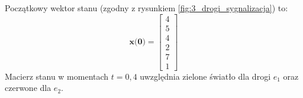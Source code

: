 \documentclass[12pt]{book}
\theoremstyle{plain}
\begin{document}
\def \xzero{
	\begin{bmatrix}
		4 \\ 5 \\ 4 \\ 2 \\ 7 \\ 1
	\end{bmatrix}
}
Początkowy wektor stanu (zgodny z rysunkiem \ref{fig:3_drogi_sygnalizacja}) to:
\[\textbf{x(0)}= \xzero \]
Macierz stanu w momentach $t=0,4$ uwzględnia zielone światło dla drogi $e_1$ oraz czerwone dla $e_2$.
\def \aeI{
\begin{bmatrix}
	0 & 0                     & 0 & 0 & 0 & 0 \\
	1 & \colorbox{red!30}{0}  & 0 & 0 & 0 & 0 \\
	0 & 0                     & 0 & 0 & 0 & 0 \\
	0 & 0                     & 1 & \colorbox{red!30}{1} & 0 & 0 & \\
	0 & \colorbox{green!30}{1}  & 0 & \colorbox{green!30}{0} & 0 & 0 \\
	0 & 0                     & 0 & 0 & 1 & 0 \\
\end{bmatrix}

}
\end{document}
